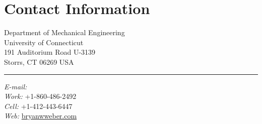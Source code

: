 
%
%
\setmainfont[Path = fonts/ ,
             Ligatures = Common ,
             Extension = .otf ,
             BoldFont = Andada-Bold ,
             ItalicFont = Andada-Italic ,
             SmallCapsFont = AndadaSC-Regular
]
{Andada-Regular}
\newfontface{}
\newfontface{}



\raggedright
\listoftodos
\vspace{1em}

\section{{\sectionfont Contact Information}}

%
\newlength{\rcolwidth}
\setlength{\rcolwidth}{2.5in}%
\newlength{\ccolwidth}
\setlength{\ccolwidth}{1pt}
\newlength{\lcolwidth}
\setlength{\lcolwidth}{\textwidth-\rcolwidth-\ccolwidth}
%
\begin{varwidth}{\lcolwidth}%
Department of Mechanical Engineering\\
University of Connecticut\\
191 Auditorium Road U-3139\\
Storrs, CT 06269 USA%
\end{varwidth}%
\hfill
\begin{varwidth}{\ccolwidth}
\rule{0.5pt}{4\baselineskip} %
\end{varwidth}%
\hfill
\begin{varwidth}{\rcolwidth}%
\textit{E-mail:} \\
\textit{Work:} +1-860-486-2492 \\
\textit{Cell:} +1-412-443-6447 \\
\textit{Web:} \href{http://bryanwweber.com}{bryanwweber.com}
\end{varwidth}%

